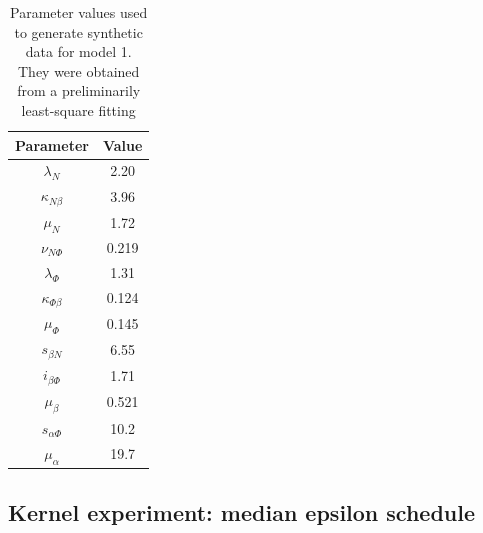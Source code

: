 \begin{table}[H]
    \centering
    \begin{tabular}{|c c|}
        \hline
        Parameter            & Value \\[0.5ex]
        \hline\hline
        $\lambda_N$          & 2.20  \\
        $\kappa_{N\beta}$    & 3.96  \\
        $\mu_N$              & 1.72  \\
        $\nu_{N\Phi}$        & 0.219 \\
        \hline
        $\lambda_\Phi$       & 1.31  \\
        $\kappa_{\Phi\beta}$ & 0.124 \\
        $\mu_\Phi$           & 0.145 \\
        \hline
        $s_{\beta N}$        & 6.55  \\
        $i_{\beta\Phi}$      & 1.71  \\
        $\mu_\beta$          & 0.521 \\
        \hline
        $s_{\alpha\Phi}$     & 10.2  \\
        $\mu_\alpha$         & 19.7  \\
        \hline
    \end{tabular}
    \caption[Parameter values used to generate synthetic data for model 1]
    {Parameter values used to generate synthetic data for model 1. They were obtained from a preliminarily least-square fitting}
    \label{table:known_values}
\end{table}

\subsection{Kernel experiment: median epsilon schedule}

